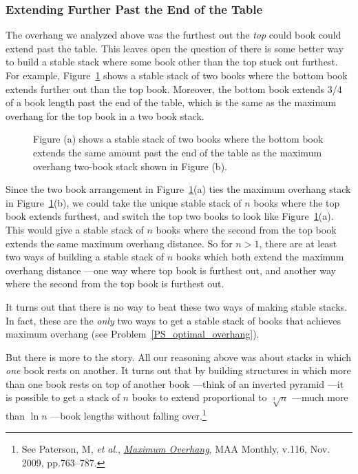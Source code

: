 \subsubsection{Extending Further Past the End of the Table}
The overhang we analyzed above was the furthest out the \emph{top}
could book could extend past the table.  This leaves open the question
of there is some better way to build a stable stack where some book
other than the top stuck out furthest.  For example,
Figure~\ref{lab:bottom-book-furthest} shows a stable stack of two
books where the bottom book extends further out than the top book.
Moreover, the bottom book extends 3/4 of a book length past the end of
the table, which is the same as the maximum overhang for the top book
in a two book stack.

\begin{figure}
\qquad
{}

\caption{Figure (a) shows a stable stack of two books where the
  bottom book extends the same amount past the end of the table as
  the maximum overhang two-book stack shown in Figure (b).}
\label{lab:bottom-book-furthest}
\end{figure}

Since the two book arrangement in
Figure~\ref{lab:bottom-book-furthest}(a) ties the maximum overhang
stack in Figure~\ref{lab:bottom-book-furthest}(b), we could take the
unique stable stack of $n$ books where the top book extends furthest,
and switch the top two books to look like
Figure~\ref{lab:bottom-book-furthest}(a).  This would give a stable
stack of $n$ books where the second from the top book extends the same
maximum overhang distance.  So for $n>1$, there are at least two ways
of building a stable stack of $n$ books which both extend the maximum
overhang distance ---one way where top book is furthest out, and
another way where the second from the top book is furthest out.

It turns out that there is no way to beat these two ways of making
stable stacks.  In fact, these are the \emph{only} two ways to get a
stable stack of books that achieves maximum overhang (see
Problem~\ref{PS_optimal_overhang}).

But there is more to the story.  All our reasoning above was about
stacks in which \emph{one} book rests on another.  It turns out that
by building structures in which more than one book rests on top of
another book ---think of an inverted pyramid ---it is possible to get
a stack of $n$ books to extend proportional to $\sqrt[3]{n}$ ---much
more than $\ln n$ ---book lengths without falling over.\footnote{See
  Paterson, M, \emph{et al}.,
  \href{http://mathdl.maa.org/mathDL/22/?pa=content&sa=viewDocument&nodeId=3623&pf=1}
       {\emph{Maximum Overhang}}, MAA Monthly, v.116, Nov. 2009,
         pp.763--787.}


